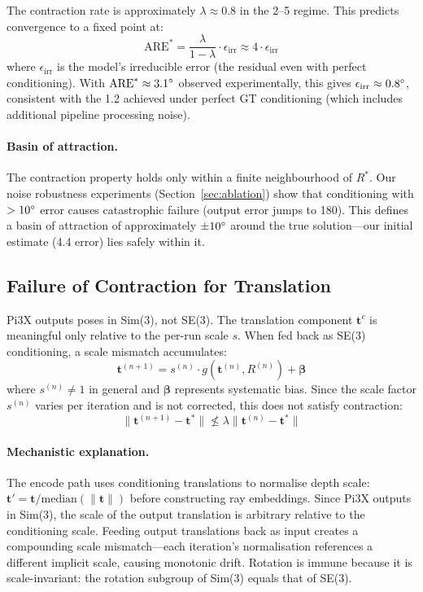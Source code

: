 The contraction rate is approximately $\lambda \approx 0.8$ in the 2--5\degree{} regime. This predicts convergence to a fixed point at:
\begin{equation}
    \text{ARE}^* = \frac{\lambda}{1-\lambda} \cdot \epsilon_{\text{irr}} \approx 4 \cdot \epsilon_{\text{irr}}
    \label{eq:fixed_point}
\end{equation}
where $\epsilon_{\text{irr}}$ is the model's irreducible error (the residual even with perfect conditioning). With $\text{ARE}^* \approx 3.1\degree{}$ observed experimentally, this gives $\epsilon_{\text{irr}} \approx 0.8\degree{}$, consistent with the 1.2\degree{} achieved under perfect GT conditioning (which includes additional pipeline processing noise).

\paragraph{Basin of attraction.} The contraction property holds only within a finite neighbourhood of $R^*$. Our noise robustness experiments (Section~\ref{sec:ablation}) show that conditioning with $>10\degree{}$ error causes catastrophic failure (output error jumps to 180\degree{}). This defines a basin of attraction of approximately $\pm 10\degree{}$ around the true solution---our initial estimate (4.4\degree{} error) lies safely within it.

\subsection{Failure of Contraction for Translation}

Pi3X outputs poses in Sim(3), not SE(3). The translation component $\mathbf{t}^c$ is meaningful only relative to the per-run scale $s$. When fed back as SE(3) conditioning, a scale mismatch accumulates:
\begin{equation}
    \mathbf{t}^{(n+1)} = s^{(n)} \cdot g(\mathbf{t}^{(n)}, R^{(n)}) + \boldsymbol{\beta}
\end{equation}
where $s^{(n)} \neq 1$ in general and $\boldsymbol{\beta}$ represents systematic bias. Since the scale factor $s^{(n)}$ varies per iteration and is not corrected, this does not satisfy contraction:
\begin{equation}
    \|\mathbf{t}^{(n+1)} - \mathbf{t}^*\| \not\leq \lambda \|\mathbf{t}^{(n)} - \mathbf{t}^*\|
\end{equation}

\paragraph{Mechanistic explanation.} The encode path uses conditioning translations to normalise depth scale: $\mathbf{t}' = \mathbf{t} / \text{median}(\|\mathbf{t}\|)$ before constructing ray embeddings. Since Pi3X outputs in Sim(3), the scale of the output translation is arbitrary relative to the conditioning scale. Feeding output translations back as input creates a compounding scale mismatch---each iteration's normalisation references a different implicit scale, causing monotonic drift. Rotation is immune because it is scale-invariant: the rotation subgroup of Sim(3) equals that of SE(3).

